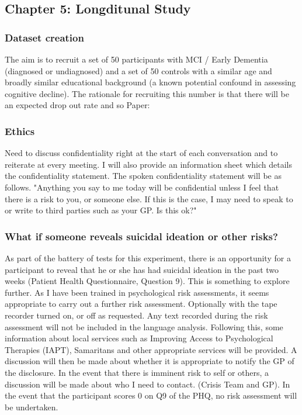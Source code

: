 \documentclass{article}
\begin{document}
\subsection{Chapter 5: Longditunal Study }
\subsubsection{Dataset creation}
The aim is to recruit a set of 50 participants with MCI / Early Dementia (diagnosed or undiagnosed) and a set of 50 controls with a similar age and broadly similar educational background (a known potential confound in assessing cognitive decline). The rationale for recruiting this number is that there will be an expected drop out rate and so
Paper:
\subsubsection{Ethics}
Need to discuss confidentiality right at the start of each conversation and to reiterate at every meeting. I will also provide an information sheet which details the confidentiality statement. The spoken confidentiality statement will be as follows.
"Anything you say to me today will be confidential unless I feel that there is a risk to you, or someone else. If this is the case, I may need to speak to or write to third parties such as your GP. Is this ok?" \newline
\par
\subsubsection{What if someone reveals suicidal ideation or other risks?}
As part of the battery of tests for this experiment, there is an opportunity for a participant to reveal that he or she has had suicidal ideation in the past two weeks (Patient Health Questionnaire, Question 9). This is something to explore further. As I have been trained in psychological risk assessments, it seems appropriate to carry out a further risk assessment.  Optionally with the tape recorder turned on, or off as requested.  Any text recorded during the risk assessment will not be included in the language analysis. Following this, some information about local services such as Improving Access to Psychological Therapies (IAPT), Samaritans and other appropriate services will be provided. A discussion will then be made about whether it is appropriate to notify the GP of the disclosure. In the event that there is imminent risk to self or others, a discussion will be made about who I need to contact. (Crisis Team and GP). In the event that the participant scores 0 on Q9 of the PHQ, no risk assessment will be undertaken. \newline
\end{document}
